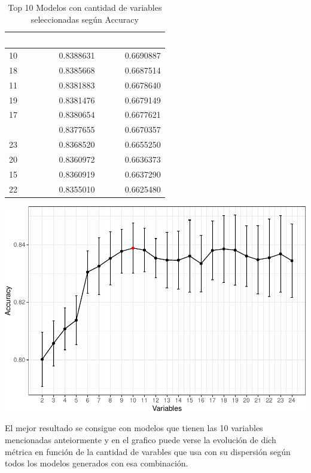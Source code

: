 \documentclass[]{article}
\begin{document}
\begin{table}[!h]

\caption{\label{tab:top_10_rfe_accuracy}Top 10 Modelos con cantidad de variables seleccionadas según Accuracy}
\centering
\begin{tabular}[t]{rrr}
\toprule
\rowcolor{black}  \multicolumn{1}{c}{\textcolor{white}{\textbf{Variables}}} & \multicolumn{1}{c}{\textcolor{white}{\textbf{media\_accuracy}}} & \multicolumn{1}{c}{\textcolor{white}{\textbf{media\_kappa}}}\\
\midrule
\rowcolor{gray!6}  10 & 0.8388631 & 0.6690887\\
18 & 0.8385668 & 0.6687514\\
\rowcolor{gray!6}  11 & 0.8381883 & 0.6678640\\
19 & 0.8381476 & 0.6679149\\
\rowcolor{gray!6}  17 & 0.8380654 & 0.6677621\\
\addlinespace
9 & 0.8377655 & 0.6670357\\
\rowcolor{gray!6}  23 & 0.8368520 & 0.6655250\\
20 & 0.8360972 & 0.6636373\\
\rowcolor{gray!6}  15 & 0.8360919 & 0.6637290\\
22 & 0.8355010 & 0.6625480\\
\bottomrule
\end{tabular}
\end{table}

\includegraphics{analisis_de_variables_files/figure-latex/rfe_evolucion_accuracy-1.pdf}

El mejor resultado se consigue con modelos que tienen las 10 variables
mencionadas anteiormente y en el grafico puede verse la evolución de
dich métrica en función de la cantidad de varables que usa con su
dispersión según todos los modelos generados con esa combinación.
\end{document}
